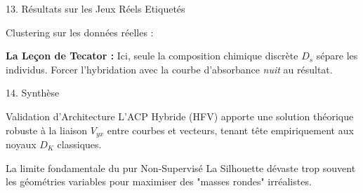 \documentclass[10pt, compress]{beamer}
\begin{document}
\begin{frame}{13. Résultats sur les Jeux Réels Etiquetés}

Clustering sur les données réelles :
\begin{table}
\centering
{}
\end{table}

\textbf{La Leçon de Tecator :}
Ici, seule la composition chimique discrète $D_s$ sépare les individus. Forcer l'hybridation avec la courbe d'absorbance \emph{nuit} au résultat.
\end{frame}

\begin{frame}{14. Synthèse}

\begin{block}{Validation d'Architecture}
L'ACP Hybride (HFV) apporte une solution théorique robuste à la liaison $V_{yx}$ entre courbes et vecteurs, tenant tête empiriquement aux noyaux $D_K$ classiques.
\end{block}

\vspace{0.5em}
\begin{alertblock}{La limite fondamentale du pur Non-Supervisé}
La Silhouette dévaste trop souvent les géométries variables pour maximiser des "masses rondes" irréalistes.
\end{alertblock}

\end{frame}

\end{document}
